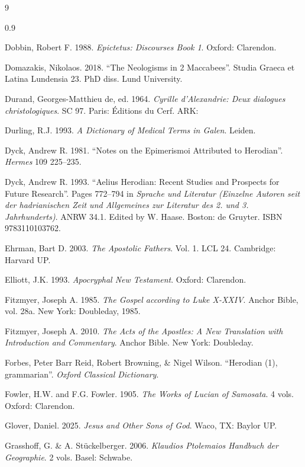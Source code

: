 \begin{thebibliography}{9}
\begin{spacing}{0.9}
\begin{small}
Dobbin, Robert F. 1988. %
\textit{Epictetus: Discourses Book 1}. %
Oxford: Clarendon. %

Domazakis, Nikolaos. 2018. %
“The Neologisms in 2 Maccabees”. %
Studia Graeca et Latina Lundensia 23. %
PhD diss. Lund University. %

Durand, Georges-Matthieu de, ed. 1964. %
\textit{Cyrille d'Alexandrie: Deux dialogues christologiques}. %
SC 97. %
Paris: Éditions du Cerf. %
ARK: 

Durling, R.J. 1993. %
\textit{A Dictionary of Medical Terms in Galen}. %
Leiden. %

Dyck, Andrew R. 1981. %
“Notes on the Epimerismoi Attributed to Herodian”. %
\textit{Hermes} 109 225--235. %

Dyck, Andrew R. 1993. %
“Aelius Herodian: Recent Studies and Prospects for Future Research”. %
Pages 772--794 in \textit{Sprache und Literatur (Einzelne Autoren seit der hadrianischen Zeit %
und Allgemeines zur Literatur des 2. und 3. Jahrhunderts)}. %
ANRW 34.1. Edited by W. Haase. %
Boston: de Gruyter. ISBN 9783110103762. %

Ehrman, Bart D. 2003. %
\textit{The Apostolic Fathers}. Vol. 1. %
LCL 24. Cambridge: Harvard UP. %

Elliott, J.K. 1993. %
\textit{Apocryphal New Testament}. %
Oxford: Clarendon. %

Fitzmyer, Joseph A. 1985. %
\textit{The Gospel according to Luke X-XXIV}. %
Anchor Bible, vol. 28a. %
New York: Doubleday, 1985. %

Fitzmyer, Joseph A. 2010. \textit{The Acts of the Apostles: %
A New Translation with Introduction and Commentary}. %
Anchor Bible. New York: Doubleday. %

Forbes, Peter Barr Reid, Robert Browning, \& Nigel Wilson. %
“Herodian (1), grammarian”. %
\textit{Oxford Classical Dictionary}. %

Fowler, H.W. and F.G. Fowler. 1905. %
\textit{The Works of Lucian of Samosata}. 4 vols. %
Oxford: Clarendon. %

Glover, Daniel. 2025. %
\textit{Jesus and Other Sons of God}. %
Waco, TX: Baylor UP. %

Grasshoff, G. \& A. Stückelberger. 2006. %
\textit{Klaudios Ptolemaios Handbuch der Geographie}. 2 vols. %
Basel: Schwabe. %


\end{small}
\end{spacing}
\end{thebibliography}
